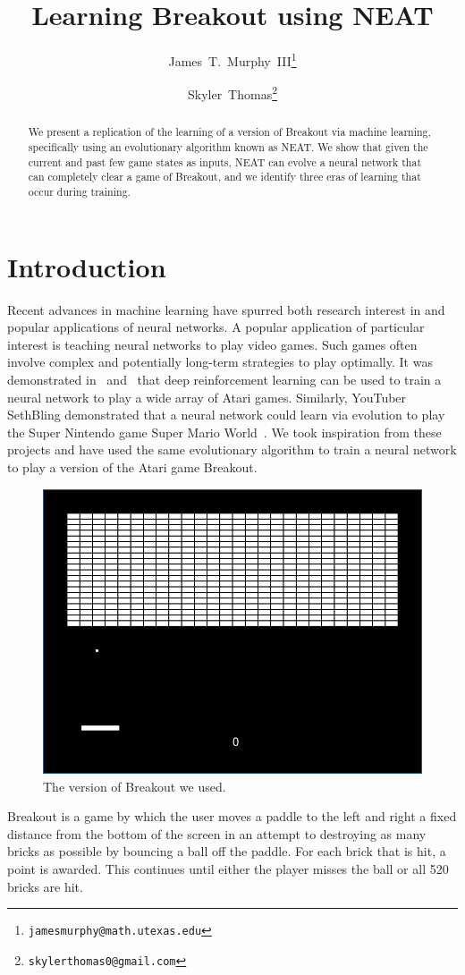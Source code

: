 \documentclass[letterpaper, twocolumn]{article}
\author{James~T.~Murphy~III\thanks{\texttt{jamesmurphy@math.utexas.edu}}\and{}Skyler~Thomas\thanks{\texttt{skylerthomas0@gmail.com}}}
\title{Learning Breakout using NEAT}
\begin{document}
\maketitle{}
\begin{abstract}
    We present a replication of the learning of a version of
    Breakout via machine learning, specifically using an evolutionary algorithm known as NEAT.
    We show that given the current and past few game states as inputs, NEAT
    can evolve a neural network that can completely clear a game of Breakout,
    and we identify three eras of learning that occur during training.
\end{abstract}

\section{Introduction}

Recent advances in machine learning have spurred both research interest in and popular applications
of neural networks.
A popular application of particular interest is teaching neural networks to play video games.
Such games often involve complex and potentially long-term strategies to play optimally.
It was demonstrated in~\cite{mnih2013playing} and~\cite{mnih2015human} that deep reinforcement learning can be used to train a neural network
to play a wide array of Atari games.
Similarly, YouTuber SethBling demonstrated that a neural network could learn via evolution to play the Super Nintendo game Super Mario World~\cite{sethbling2015}.
We took inspiration from these projects and have used the same evolutionary algorithm to train a neural network
to play a version of the Atari game Breakout.

\begin{figure}[h!]
    \centering
    \includegraphics[width=.45\textwidth]{breakout.png}
    \caption{The version of Breakout we used.}
\end{figure}

Breakout is a game by which the user moves a paddle to the left and right a fixed distance
from the bottom of the screen in an attempt to destroying as many bricks as possible
by bouncing a ball off the paddle.
For each brick that is hit, a point is awarded.
This continues until either the player misses the ball or all 520 bricks are hit.
\end{document}
